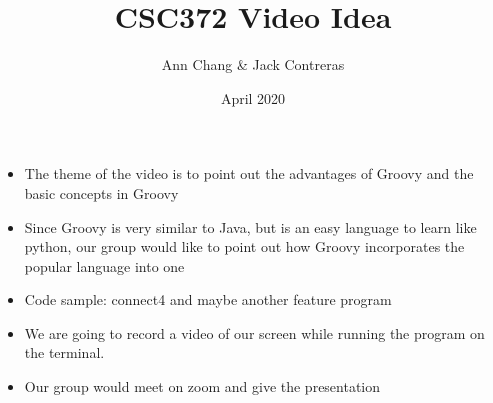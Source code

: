 \documentclass{article}
\title{CSC372 Video Idea}
\author{Ann Chang & Jack Contreras}
\date{April 2020}
\begin{document}
\maketitle
\begin{itemize}
    \item The theme of the video is to point out the advantages of Groovy and the basic concepts in Groovy
    \item Since Groovy is very similar to Java, but is an easy language to learn like python, our group would like to point out how Groovy incorporates the popular language into one
    \item Code sample: connect4 and maybe another feature program
    \item We are going to record a video of our screen while running the program on the terminal. 
    \item Our group would meet on zoom and give the presentation
\end{itemize}
\end{document}
